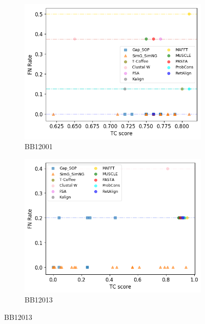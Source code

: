 \begin{figure}[!htbp]
	\centering
	\begin{adjustwidth}{-1cm}{-1cm}
		\begin{subfigure}{0.22\textwidth}
			\includegraphics[width=\columnwidth]{Figure/summary/precomputedInit/Balibase/BB12001_fnrate_vs_tc_2}
			\caption{BB12001}
		\end{subfigure}	
		\begin{subfigure}{0.22\textwidth}
			\includegraphics[width=\columnwidth]{Figure/summary/precomputedInit/Balibase/BB12013_fnrate_vs_tc_2}
			\caption{BB12013}
		\end{subfigure}

\end{adjustwidth}
\end{figure}
